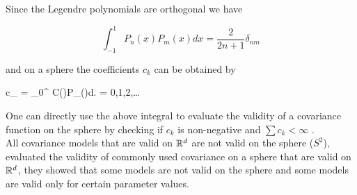 
Since the Legendre polynomials are orthogonal we have

\[
	\int_{-1}^{1} P_{n}(x)P_{m}(x)dx = \frac{2}{2n+1}\delta_{nm}
\]

and on a sphere the coefficients $c_k$ can be obtained by

\beq \label{covs2_coef}
c_{\nu} = \int_0^{\pi} C(\theta)P_{\nu}(\cos\theta)d\theta. \quad \nu = 0,1,2,\ldots
\eeq

One can directly use the above integral to evaluate the validity of a covariance function on the sphere by checking if $c_k$ is non-negative and $\sum c_k < \infty$ .\\ 

All covariance models that are valid on $\mathbb{R}^d$ are not valid on the sphere ($S^2$), \cite{HuangZhangRobeson2011} evaluated the validity of commonly used covariance on a sphere that are valid on $\mathbb{R}^d$, they showed that some models are not valid on the sphere and some models are valid only for certain parameter values.  
 

